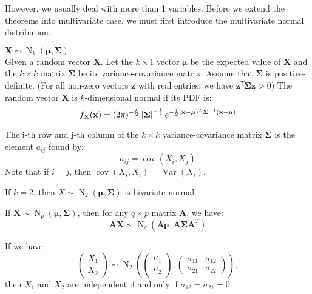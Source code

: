 \documentclass{huhtakm-template-book-v2}
\DeclareMathOperator{\Var}{Var}
\DeclareMathOperator{\cov}{cov}
\DeclareMathOperator{\N}{N}
\begin{document}
\newpage
However, we usually deal with more than 1 variables. Before we extend the theorems into multivariate case, we must first introduce the multivariate normal distribution.
\begin{eg} $\mathbf{X}\sim\N_{k}(\boldsymbol{\mu},\mathbf{\Sigma})$\\
	Given a random vector $\mathbf{X}$. Let the $k\times 1$ vector $\boldsymbol{\mu}$ be the expected value of $\mathbf{X}$ and the $k\times k$ matrix $\mathbf{\Sigma}$ be its variance-covariance matrix. Assume that $\mathbf{\Sigma}$ is positive-definite. (For all non-zero vectors $\mathbf{z}$ with real entries, we have $\mathbf{z}^{T}\mathbf{\Sigma z}>0$) The random vector $\mathbf{X}$ is $k$-dimensional normal if its PDF is:
	\begin{equation*}
		f_{\mathbf{X}}(\mathbf{x})=(2\pi)^{-\frac{k}{2}}\left|{\mathbf{\Sigma}}\right|^{-\frac{1}{2}}e^{-\frac{1}{2}(\mathbf{x}-\boldsymbol{\mu})^{T}\mathbf{\Sigma}^{-1}(\mathbf{x}-\boldsymbol{\mu})}
	\end{equation*}
\end{eg}
\begin{rem}
	The i-th row and j-th column of the $k\times k$ variance-covariance matrix $\mathbf{\Sigma}$ is the element $a_{ij}$ found by:
	\begin{equation*}
		a_{ij}=\cov(X_{i},X_{j})
	\end{equation*}
	Note that if $i=j$, then $\cov(X_{i},X_{i})=\Var(X_{i})$.
\end{rem}
\begin{eg}
	If $k=2$, then $X\sim\N_{2}(\boldsymbol{\mu},\mathbf{\Sigma})$ is bivariate normal.
\end{eg}
\begin{lem}
	\label{Chapter 1 (Lemma) Distribution of matrix multiplication with random vector}
	If $\mathbf{X}\sim\N_{p}(\boldsymbol{\mu},\mathbf{\Sigma})$, then for any $q\times p$ matrix $\mathbf{A}$, we have:
	\begin{equation*}
		\mathbf{AX}\sim\N_{q}(\mathbf{A}\boldsymbol{\mu},\mathbf{A\Sigma A}^{T})
	\end{equation*}
\end{lem}
\begin{lem}
	\label{Chapter 1 (Lemma) Independence iff uncorrelated and bivariate}
	If we have:
	\begin{equation*}
		\begin{pmatrix}X_{1}\\X_{2}\end{pmatrix}\sim\N_{2}\left(\begin{pmatrix}\mu_{1}\\\mu_{2}\end{pmatrix},\begin{pmatrix}\sigma_{11}&\sigma_{12}\\\sigma_{21}&\sigma_{22}\end{pmatrix}\right),
	\end{equation*}
	then $X_{1}$ and $X_{2}$ are independent if and only if $\sigma_{12}=\sigma_{21}=0$.
\end{lem}
\end{document}

